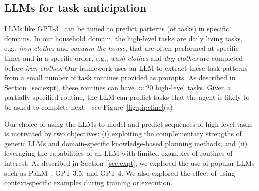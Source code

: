 \subsection{LLMs for task anticipation}
LLMs like GPT-3~\cite{brown2020language} can be tuned to predict patterns (of tasks) in specific domains. %
In our household domain, the high-level tasks are daily living tasks, e.g., \textit{iron clothes} and \textit{vacuum the house}, that are often performed at specific times and in a specific order, e.g., \textit{wash clothes} and \textit{dry clothes} are completed before \textit{iron clothes}. Our framework uses an LLM to extract these task patterns from a small number of task routines provided as prompts. As described in Section~\ref{sec:expt}, these routines can have $\approx 20$ high-level tasks. Given a partially specified routine, the LLM can predict tasks that the agent is likely to be asked to complete next---see Figure~\ref{fig:pipeline}(a).

Our choice of using the LLMs to model and predict sequences of high-level tasks is motivated by two objectives: (i) exploiting the complementary strengths of generic LLMs and domain-specific knowledge-based planning methods; and (ii) leveraging the capabilities of an LLM with limited examples of routines of interest. As described in Section~\ref{sec:expt}, we explored the use of popular LLMs such as PaLM~\cite{chowdhery2022palm}, GPT-3.5\cite{brown2020language}, and GPT-4\cite{OpenAI2023GPT4TR}. We also explored the effect of using context-specific examples during training or execution. %


